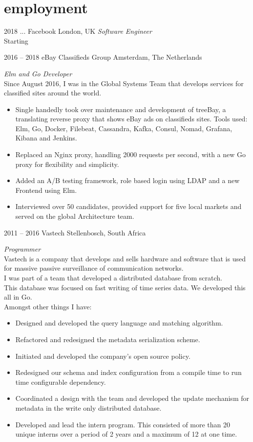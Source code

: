 \documentclass[]{friggeri-cv-a4} %
\begin{document}
\section{employment}
\begin{entrylist}

\entry
{2018 ...}
{Facebook}
{London, UK}
{\emph{Software Engineer} \\
Starting
}

\entry
{2016 -- 2018}
{eBay Classifieds Group}
{Amsterdam, The Netherlands}
{\emph{Elm and Go Developer} \\
Since August 2016, I was in the Global Systems Team that develops services for classified sites around the world.
\begin{itemize}
\item Single handedly took over maintenance and development of treeBay, a translating reverse proxy that shows eBay ads on classifieds sites.
      Tools used: Elm, Go, Docker, Filebeat, Cassandra, Kafka, Consul, Nomad, Grafana, Kibana and Jenkins.
\item Replaced an Nginx proxy, handling 2000 requests per second, with a new Go proxy for flexibility and simplicity.
\item Added an A/B testing framework, role based login using LDAP and a new Frontend using Elm.
\item Interviewed over 50 candidates, provided support for five local markets and served on the global Architecture team.
\end{itemize}
}

\entry
{2011 -- 2016}
{Vastech}
{Stellenbosch, South Africa}
{\emph{Programmer} \\
Vastech is a company that develops and sells hardware and software that is used for massive passive surveillance of communication networks. \\
I was part of a team that developed a distributed database from scratch. \\
This database was focused on fast writing of time series data.  We developed this all in Go. \\
Amongst other things I have: \\
\begin{itemize}
\item Designed and developed the query language and matching algorithm.
\item Refactored and redesigned the metadata serialization scheme.
\item Initiated and developed the company's open source policy.
\item Redesigned our schema and index configuration from a compile time to run time configurable dependency.
\item Coordinated a design with the team and developed the update mechanism for metadata in the write only distributed database.
\item Developed and lead the intern program. This consisted of more than 20 unique interns over a period of 2 years and a maximum of 12 at one time.
\end{itemize}
}


\end{entrylist}
\end{document}
